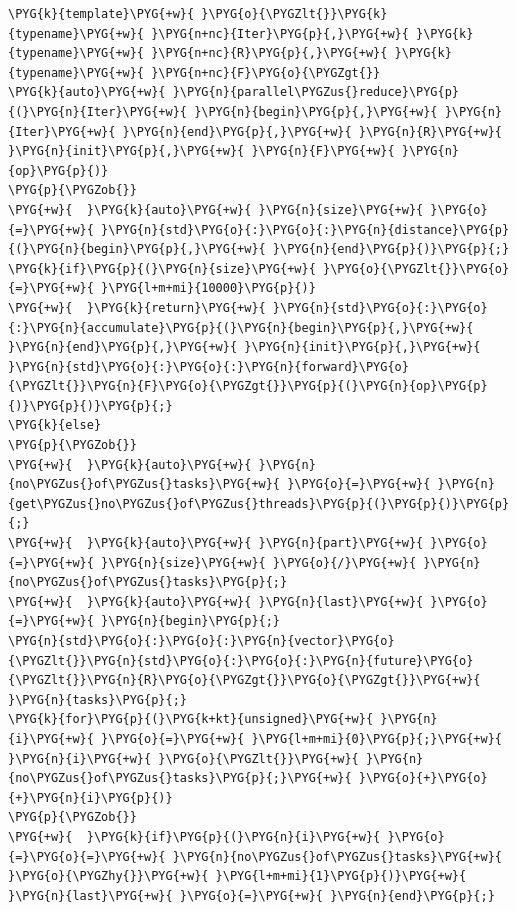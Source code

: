 \begin{codeblockbg}
\begin{Verbatim}[commandchars=\\\{\},breaklines=true,breakanywhere=true,fontsize=\codefont,xleftmargin=17bp]
\PYG{k}{template}\PYG{+w}{ }\PYG{o}{\PYGZlt{}}\PYG{k}{typename}\PYG{+w}{ }\PYG{n+nc}{Iter}\PYG{p}{,}\PYG{+w}{ }\PYG{k}{typename}\PYG{+w}{ }\PYG{n+nc}{R}\PYG{p}{,}\PYG{+w}{ }\PYG{k}{typename}\PYG{+w}{ }\PYG{n+nc}{F}\PYG{o}{\PYGZgt{}}
\PYG{k}{auto}\PYG{+w}{ }\PYG{n}{parallel\PYGZus{}reduce}\PYG{p}{(}\PYG{n}{Iter}\PYG{+w}{ }\PYG{n}{begin}\PYG{p}{,}\PYG{+w}{ }\PYG{n}{Iter}\PYG{+w}{ }\PYG{n}{end}\PYG{p}{,}\PYG{+w}{ }\PYG{n}{R}\PYG{+w}{ }\PYG{n}{init}\PYG{p}{,}\PYG{+w}{ }\PYG{n}{F}\PYG{+w}{ }\PYG{n}{op}\PYG{p}{)}
\PYG{p}{\PYGZob{}}
\PYG{+w}{  }\PYG{k}{auto}\PYG{+w}{ }\PYG{n}{size}\PYG{+w}{ }\PYG{o}{=}\PYG{+w}{ }\PYG{n}{std}\PYG{o}{:}\PYG{o}{:}\PYG{n}{distance}\PYG{p}{(}\PYG{n}{begin}\PYG{p}{,}\PYG{+w}{ }\PYG{n}{end}\PYG{p}{)}\PYG{p}{;}
\PYG{k}{if}\PYG{p}{(}\PYG{n}{size}\PYG{+w}{ }\PYG{o}{\PYGZlt{}}\PYG{o}{=}\PYG{+w}{ }\PYG{l+m+mi}{10000}\PYG{p}{)}
\PYG{+w}{  }\PYG{k}{return}\PYG{+w}{ }\PYG{n}{std}\PYG{o}{:}\PYG{o}{:}\PYG{n}{accumulate}\PYG{p}{(}\PYG{n}{begin}\PYG{p}{,}\PYG{+w}{ }\PYG{n}{end}\PYG{p}{,}\PYG{+w}{ }\PYG{n}{init}\PYG{p}{,}\PYG{+w}{ }\PYG{n}{std}\PYG{o}{:}\PYG{o}{:}\PYG{n}{forward}\PYG{o}{\PYGZlt{}}\PYG{n}{F}\PYG{o}{\PYGZgt{}}\PYG{p}{(}\PYG{n}{op}\PYG{p}{)}\PYG{p}{)}\PYG{p}{;}
\PYG{k}{else}
\PYG{p}{\PYGZob{}}
\PYG{+w}{  }\PYG{k}{auto}\PYG{+w}{ }\PYG{n}{no\PYGZus{}of\PYGZus{}tasks}\PYG{+w}{ }\PYG{o}{=}\PYG{+w}{ }\PYG{n}{get\PYGZus{}no\PYGZus{}of\PYGZus{}threads}\PYG{p}{(}\PYG{p}{)}\PYG{p}{;}
\PYG{+w}{  }\PYG{k}{auto}\PYG{+w}{ }\PYG{n}{part}\PYG{+w}{ }\PYG{o}{=}\PYG{+w}{ }\PYG{n}{size}\PYG{+w}{ }\PYG{o}{/}\PYG{+w}{ }\PYG{n}{no\PYGZus{}of\PYGZus{}tasks}\PYG{p}{;}
\PYG{+w}{  }\PYG{k}{auto}\PYG{+w}{ }\PYG{n}{last}\PYG{+w}{ }\PYG{o}{=}\PYG{+w}{ }\PYG{n}{begin}\PYG{p}{;}
\PYG{n}{std}\PYG{o}{:}\PYG{o}{:}\PYG{n}{vector}\PYG{o}{\PYGZlt{}}\PYG{n}{std}\PYG{o}{:}\PYG{o}{:}\PYG{n}{future}\PYG{o}{\PYGZlt{}}\PYG{n}{R}\PYG{o}{\PYGZgt{}}\PYG{o}{\PYGZgt{}}\PYG{+w}{ }\PYG{n}{tasks}\PYG{p}{;}
\PYG{k}{for}\PYG{p}{(}\PYG{k+kt}{unsigned}\PYG{+w}{ }\PYG{n}{i}\PYG{+w}{ }\PYG{o}{=}\PYG{+w}{ }\PYG{l+m+mi}{0}\PYG{p}{;}\PYG{+w}{ }\PYG{n}{i}\PYG{+w}{ }\PYG{o}{\PYGZlt{}}\PYG{+w}{ }\PYG{n}{no\PYGZus{}of\PYGZus{}tasks}\PYG{p}{;}\PYG{+w}{ }\PYG{o}{+}\PYG{o}{+}\PYG{n}{i}\PYG{p}{)}
\PYG{p}{\PYGZob{}}
\PYG{+w}{  }\PYG{k}{if}\PYG{p}{(}\PYG{n}{i}\PYG{+w}{ }\PYG{o}{=}\PYG{o}{=}\PYG{+w}{ }\PYG{n}{no\PYGZus{}of\PYGZus{}tasks}\PYG{+w}{ }\PYG{o}{\PYGZhy{}}\PYG{+w}{ }\PYG{l+m+mi}{1}\PYG{p}{)}\PYG{+w}{ }\PYG{n}{last}\PYG{+w}{ }\PYG{o}{=}\PYG{+w}{ }\PYG{n}{end}\PYG{p}{;}

\end{Verbatim}
\end{codeblockbg}

